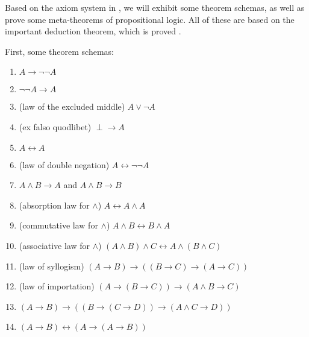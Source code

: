 \documentclass[12pt]{article}
\begin{document}
Based on the axiom system in , we will exhibit some theorem schemas, as well as prove some meta-theorems of propositional logic.  All of these are based on the important deduction theorem, which is proved .

First, some theorem schemas:
\begin{enumerate}
\item $A\to \neg \neg A$
\item $\neg \neg A \to A$
\item (law of the excluded middle) $A\lor \neg A$
\item (ex falso quodlibet) $\perp \to A$
\item $A\leftrightarrow A$
\item (law of double negation) $A\leftrightarrow \neg \neg A$
\item $A\land B \to A$ and $A\land B \to B$
\item (absorption law for $\land$) $A \leftrightarrow A\land A$
\item (commutative law for $\land$) $A \land B \leftrightarrow B\land A$
\item (associative law for $\land$) $(A\land B)\land C \leftrightarrow A \land (B\land C)$
\item (law of syllogism) $(A\to B)\to ((B\to C)\to (A\to C))$
\item (law of importation) $(A\to (B\to C))\to (A\land B \to C)$
\item $(A\to B)\to ((B\to (C\to D))\to (A\land C \to D))$
\item $(A\to B)\leftrightarrow (A\to (A\to B))$
\end{enumerate}
\end{document}
